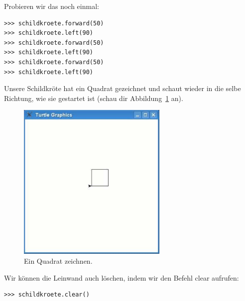 Probieren wir das noch einmal:

\begin{Verbatim}[frame=single]
>>> schildkroete.forward(50)
>>> schildkroete.left(90)
>>> schildkroete.forward(50)
>>> schildkroete.left(90)
>>> schildkroete.forward(50)
>>> schildkroete.left(90)
\end{Verbatim}

Unsere Schildkröte hat ein Quadrat gezeichnet und schaut wieder in die selbe Richtung, wie sie gestartet ist (schau dir Abbildung~\ref{fig16} an).

\begin{figure}
\begin{center}
\includegraphics[width=72mm]{images/figure16}
\end{center}
\caption{Ein Quadrat zeichnen.}\label{fig16}
\end{figure}

Wir können die Leinwand auch löschen, indem wir den Befehl clear aufrufen:

\begin{Verbatim}[frame=single]
>>> schildkroete.clear()
\end{Verbatim}

